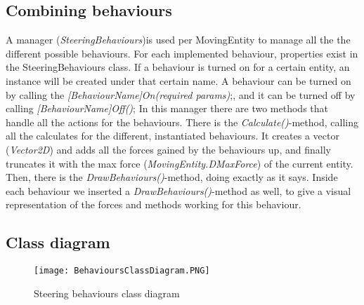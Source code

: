 \subsection[How the steering behaviours are combined]{Combining behaviours}\label{subsec:combiningBehaviours}
A manager (\textit{SteeringBehaviours})is used per MovingEntity to manage all the the different possible behaviours.
For each implemented behaviour, properties exist in the SteeringBehaviours class.
If a behaviour is turned on for a certain entity, an instance will be created under that certain name.
A behaviour can be turned on by calling the \textit{[BehaviourName]On(required params)};, and it can be turned off by calling \textit{[BehaviourName]Off()};
In this manager there are two methods that handle all the actions for the behaviours.
There is the \textit{Calculate()}-method, calling all the calculates for the different, instantiated behaviours.
It creates a vector (\textit{Vector2D}) and adds all the forces gained by the behaviours up, and finally truncates it with the max force (\textit{MovingEntity.DMaxForce}) of the current entity.
Then, there is the \textit{DrawBehaviours()}-method, doing exactly as it says.
Inside each behaviour we inserted a \textit{DrawBehaviours()}-method as well, to give a visual representation of the forces and methods working for this behaviour.
\newpage
\subsection[The class diagram of our behaviour system]{Class diagram}
\begin{figure}[h!]
    \begin{center}
        \texttt{[image: BehavioursClassDiagram.PNG]}
    \end{center}
    \caption{Steering behaviours class diagram}
    \label{fig:SteeringBehavioursClassDiagram}
\end{figure}
\newpage
